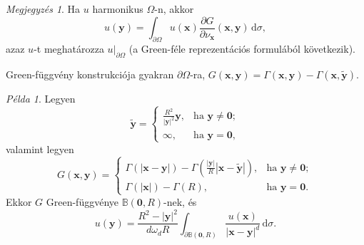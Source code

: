 \documentclass[%
	DIV=15,appendixprefix]{scrreprt}
\theoremstyle{definition}
\theoremstyle{remark}
\newtheorem*{megj}{Megjegyzés}
\newtheorem*{pelda}{Példa}
\newcommand{\ball}{\mathbb{B}}
\begin{document}
\begin{megj}
	Ha $ u $ harmonikus $\Omega$-n, akkor
	\begin{equation*}
		u \left( \mathbf{ y } \right) = \int_{ \partial \Omega } u \left( \mathbf{ x } \right) \frac{ \partial G }{ \partial \nu_{ \mathbf{ x } } } \left( \mathbf{ x },{} \mathbf{ y } \right) \, \mathrm{ d }\sigma,
	\end{equation*}
	azaz $ u $-t meghatározza $ \left. u \right|_{ \partial \Omega } $ (a Green-féle reprezentációs
	formulából következik).
\end{megj}
Green-függvény konstrukciója gyakran  $ \partial \Omega $-ra, $ G \left(
\mathbf{ x },{} \mathbf{ y } \right) = \Gamma \left( \mathbf{ x },{} \mathbf{ y } \right) - \Gamma
\left( \mathbf{ x },{} \tilde{ \mathbf{ y } } \right) $.
\begin{pelda}
	Legyen
	\begin{equation*}
		\tilde{ \mathbf{ y } } = \begin{cases}
			\frac{ R^{ 2 } }{ \left| \mathbf{ y } \right|^{ 2 } } \mathbf{ y }, & \text{ha }
				\mathbf{ y } \neq \mathbf{ 0 };\\
			\infty, & \text{ha } \mathbf{ y } = \mathbf{ 0 },
		\end{cases}
	\end{equation*}
	valamint legyen
	\begin{equation*}
		G \left( \mathbf{ x },{} \mathbf{ y } \right) = \begin{cases}
			\Gamma \left( \left| \mathbf{ x } - \mathbf{ y } \right| \right) - \Gamma \left( \frac{
				\left| \mathbf{ y } \right| }{ R } \left| \mathbf{ x } - \tilde{ \mathbf{ y } }
				\right| \right), & \text{ha } \mathbf{ y } \neq \mathbf{ 0 };\\
			\Gamma \left( \left| \mathbf{ x } \right| \right) - \Gamma \left( R \right), &
				\text{ha } \mathbf{ y } = \mathbf{ 0 }.
		\end{cases}
	\end{equation*}
	Ekkor $ G $ Green-függvénye $ \ball \left( \mathbf{ 0 },{} R \right) $-nek, és
	\begin{equation*}
		u \left( \mathbf{ y } \right) = \frac{ R^{ 2 } - \left| \mathbf{ y } \right|^{ 2 } }{ d
		\omega_{ d } R } \int_{ \partial \ball \left( \mathbf{ 0 },{} R \right) } \frac{ u \left(
		\mathbf{ x } \right)}{ \left| \mathbf{ x } - \mathbf{ y } \right|^{ d } } \,
		\mathrm{ d }\sigma.
	\end{equation*}
\end{pelda}
%
\end{document}
